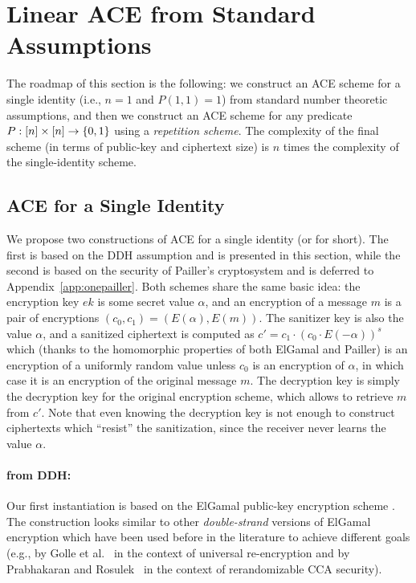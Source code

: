\documentclass{llncs}
\begin{document}
\section{Linear ACE from Standard Assumptions}\label{sec:linear}


The roadmap of this section is the following: we construct an ACE scheme for a single identity (i.e., $n=1$ and $P(1,1)=1$) from standard number theoretic assumptions, and then we construct an ACE scheme for any predicate $P:[n]\times [n]\to \{0,1\}$ using a \emph{repetition scheme}. The complexity of the final scheme (in terms of public-key and ciphertext size) is $n$ times the complexity of the single-identity scheme.






\subsection{ACE for a Single Identity}

We propose two constructions of ACE for a single identity (or \oACE for short). The first is based on the DDH assumption and is presented in this section, while the second is based on the security of Pailler's cryptosystem and is deferred to Appendix~\ref{app:onepailler}. Both schemes share the same basic idea: the encryption key $ek$ is some secret value $\alpha$, and an encryption of a message $m$ is a pair of encryptions $(c_0,c_1)=(E(\alpha),E(m))$. The sanitizer key is also the value $\alpha$, and a sanitized ciphertext is computed as $c'=c_1\cdot (c_0\cdot E(-\alpha))^s$ which (thanks to the homomorphic properties of both ElGamal and Pailler) is an encryption of a uniformly random value unless $c_0$ is an encryption of $\alpha$, in which case it is an encryption of the original message $m$. The decryption key is simply the decryption key for the original encryption scheme, which allows to retrieve $m$ from $c'$. Note that even knowing the decryption key is not enough to construct ciphertexts which ``resist'' the sanitization, since the receiver never learns the value $\alpha$.



\paragraph{\oACE from DDH:}
Our first instantiation is based on the ElGamal public-key encryption scheme \cite{DBLP:journals/tit/Elgamal85}. The construction looks similar to other \emph{double-strand} versions of ElGamal encryption which have been used before in the literature to achieve different goals (e.g., by Golle et al.~\cite{DBLP:conf/ctrsa/GolleJJS04} in the context of universal re-encryption and by Prabhakaran and Rosulek~\cite{DBLP:conf/crypto/PrabhakaranR07} in the context of rerandomizable CCA security). 
\end{document}
